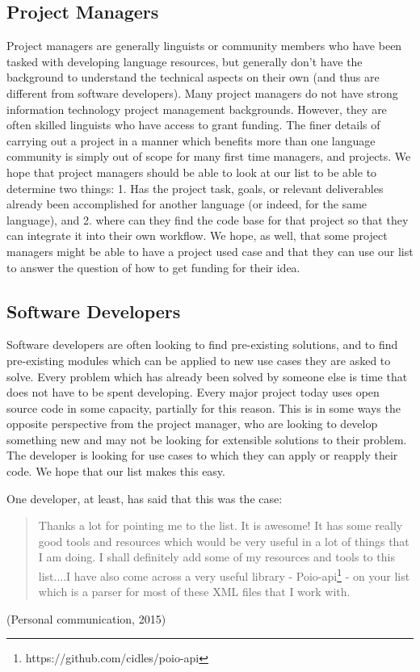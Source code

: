 \documentclass[10pt, a4paper]{article}
\begin{document}
\subsection{Project Managers}

Project managers are generally linguists or community members who have been tasked with developing language resources, but generally don't have the background to understand the technical aspects on their own (and thus are different from software developers). Many project managers do not have strong information technology project management backgrounds. However, they are often skilled linguists who have access to grant funding. The finer details of carrying out a project in a manner which benefits more than one language community is simply out of scope for many first time managers, and projects. We hope that project managers should be able to look at our list to be able to determine two things: 1. Has the project task, goals, or relevant deliverables already been accomplished for another language (or indeed, for the same language), and 2. where can they find the code base for that project so that they can integrate it into their own workflow. We hope, as well, that some project managers might be able to have a project used case and that they can use our list to answer the question of how to get funding for their idea. 

\subsection{Software Developers}

Software developers are often looking to find pre-existing solutions, and to find pre-existing modules which can be applied to new use cases they are asked to solve. Every problem which has already been solved by someone else is time that does not have to be spent developing. Every major project today uses open source code in some capacity, partially for this reason. This is in some ways the opposite perspective from the project manager, who are looking to develop something new and may not be looking for extensible solutions to their problem. The developer is looking for use cases to which they can apply or reapply their code. We hope that our list makes this easy. 

One developer, at least, has said that this was the case: \begin{quote}Thanks a lot for pointing me to the list. It is awesome! It has some really good tools and resources which would be very useful in a lot of things that I am doing. I shall definitely add some of my resources and tools to this list....I have also come across a very useful library - Poio-api\footnote{https://github.com/cidles/poio-api} - on your list which is a parser for most of these XML files that I work with.\end{quote} (Personal communication, 2015)
\end{document}
